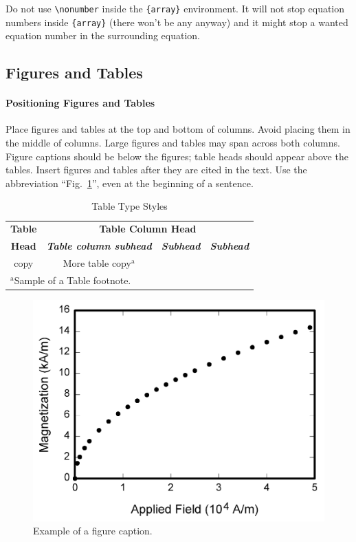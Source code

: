 \documentclass[conference]{IEEEtran}
\begin{document}
Do not use \verb|\nonumber| inside the \verb|{array}| environment. It
will not stop equation numbers inside \verb|{array}| (there won't be
any anyway) and it might stop a wanted equation number in the
surrounding equation.



\subsection{Figures and Tables}\label{FAT}
\paragraph{Positioning Figures and Tables} Place figures and tables at the top and 
bottom of columns. Avoid placing them in the middle of columns. Large 
figures and tables may span across both columns. Figure captions should be 
below the figures; table heads should appear above the tables. Insert 
figures and tables after they are cited in the text. Use the abbreviation 
``Fig.~\ref{fig}'', even at the beginning of a sentence.

\begin{table}[htbp]
\caption{Table Type Styles}
\begin{center}
\begin{tabular}{|c|c|c|c|}
\hline
\textbf{Table}&\multicolumn{3}{|c|}{\textbf{Table Column Head}} \\
\cline{2-4} 
\textbf{Head} & \textbf{\textit{Table column subhead}}& \textbf{\textit{Subhead}}& \textbf{\textit{Subhead}} \\
\hline
copy& More table copy$^{\mathrm{a}}$& &  \\
\hline
\multicolumn{4}{l}{$^{\mathrm{a}}$Sample of a Table footnote.}
\end{tabular}
\label{tab1}
\end{center}
\end{table}

\begin{figure}[htbp]
\centerline{\includegraphics{fig1.png}}
\caption{Example of a figure caption.}
\label{fig}
\end{figure}
\end{document}
